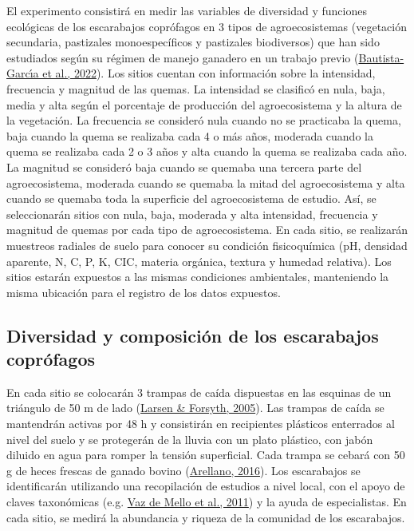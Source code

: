 \documentclass[
  11pt,
  a4paper]{book}
\begin{document}
El experimento consistirá en medir las variables de diversidad y funciones ecológicas de los escarabajos coprófagos en 3 tipos de agroecosistemas (vegetación secundaria, pastizales monoespecíficos y pastizales biodiversos) que han sido estudiados según su régimen de manejo ganadero en un trabajo previo (\protect\hyperlink{ref-bautista2022estudio}{Bautista-Garcı́a et al., 2022}). Los sitios cuentan con información sobre la intensidad, frecuencia y magnitud de las quemas. La intensidad se clasificó en nula, baja, media y alta según el porcentaje de producción del agroecosistema y la altura de la vegetación. La frecuencia se consideró nula cuando no se practicaba la quema, baja cuando la quema se realizaba cada 4 o más años, moderada cuando la quema se realizaba cada 2 o 3 años y alta cuando la quema se realizaba cada año. La magnitud se consideró baja cuando se quemaba una tercera parte del agroecosistema, moderada cuando se quemaba la mitad del agroecosistema y alta cuando se quemaba toda la superficie del agroecosistema de estudio. Así, se seleccionarán sitios con nula, baja, moderada y alta intensidad, frecuencia y magnitud de quemas por cada tipo de agroecosistema. En cada sitio, se realizarán muestreos radiales de suelo para conocer su condición fisicoquímica (pH, densidad aparente, N, C, P, K, CIC, materia orgánica, textura y humedad relativa). Los sitios estarán expuestos a las mismas condiciones ambientales, manteniendo la misma ubicación para el registro de los datos expuestos.

\hypertarget{diversidad-y-composiciuxf3n-de-los-escarabajos-copruxf3fagos}{%
\subsection{Diversidad y composición de los escarabajos coprófagos}\label{diversidad-y-composiciuxf3n-de-los-escarabajos-copruxf3fagos}}

En cada sitio se colocarán 3 trampas de caída dispuestas en las esquinas de un triángulo de 50 m de lado (\protect\hyperlink{ref-larsen2005trap}{Larsen \& Forsyth, 2005}). Las trampas de caída se mantendrán activas por 48 h y consistirán en recipientes plásticos enterrados al nivel del suelo y se protegerán de la lluvia con un plato plástico, con jabón diluido en agua para romper la tensión superficial. Cada trampa se cebará con 50 g de heces frescas de ganado bovino (\protect\hyperlink{ref-arellano2016novel}{Arellano, 2016}). Los escarabajos se identificarán utilizando una recopilación de estudios a nivel local, con el apoyo de claves taxonómicas (e.g. \protect\hyperlink{ref-vaz2011multilingual}{Vaz de Mello et al., 2011}) y la ayuda de especialistas. En cada sitio, se medirá la abundancia y riqueza de la comunidad de los escarabajos.
\end{document}
